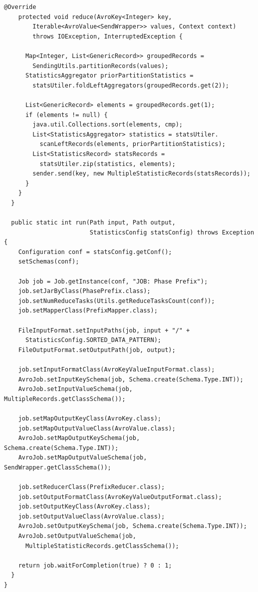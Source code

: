 \documentclass[magisterska]{pracamgr}
\begin{document}
\begin{lstlisting}[language=SmallJava,firstnumber=1,label=hadoop_prefix,caption=Faza liczenia statystyk prefiksowych]
    @Override
    protected void reduce(AvroKey<Integer> key,
        Iterable<AvroValue<SendWrapper>> values, Context context)
        throws IOException, InterruptedException {
        
      Map<Integer, List<GenericRecord>> groupedRecords =   
        SendingUtils.partitionRecords(values);
      StatisticsAggregator priorPartitionStatistics =
        statsUtiler.foldLeftAggregators(groupedRecords.get(2));

      List<GenericRecord> elements = groupedRecords.get(1);
      if (elements != null) {
        java.util.Collections.sort(elements, cmp);
        List<StatisticsAggregator> statistics = statsUtiler.
          scanLeftRecords(elements, priorPartitionStatistics);
        List<StatisticsRecord> statsRecords =
          statsUtiler.zip(statistics, elements);
        sender.send(key, new MultipleStatisticRecords(statsRecords));
      }
    }
  }

  public static int run(Path input, Path output,
                        StatisticsConfig statsConfig) throws Exception {
    Configuration conf = statsConfig.getConf();
    setSchemas(conf);

    Job job = Job.getInstance(conf, "JOB: Phase Prefix");
    job.setJarByClass(PhasePrefix.class);
    job.setNumReduceTasks(Utils.getReduceTasksCount(conf));
    job.setMapperClass(PrefixMapper.class);

    FileInputFormat.setInputPaths(job, input + "/" + 
      StatisticsConfig.SORTED_DATA_PATTERN);
    FileOutputFormat.setOutputPath(job, output);

    job.setInputFormatClass(AvroKeyValueInputFormat.class);
    AvroJob.setInputKeySchema(job, Schema.create(Schema.Type.INT));
    AvroJob.setInputValueSchema(job, MultipleRecords.getClassSchema());

    job.setMapOutputKeyClass(AvroKey.class);
    job.setMapOutputValueClass(AvroValue.class);
    AvroJob.setMapOutputKeySchema(job, Schema.create(Schema.Type.INT));
    AvroJob.setMapOutputValueSchema(job, SendWrapper.getClassSchema());

    job.setReducerClass(PrefixReducer.class);
    job.setOutputFormatClass(AvroKeyValueOutputFormat.class);
    job.setOutputKeyClass(AvroKey.class);
    job.setOutputValueClass(AvroValue.class);
    AvroJob.setOutputKeySchema(job, Schema.create(Schema.Type.INT));
    AvroJob.setOutputValueSchema(job,
      MultipleStatisticRecords.getClassSchema());

    return job.waitForCompletion(true) ? 0 : 1;
  }
}
\end{lstlisting}
\end{document}
